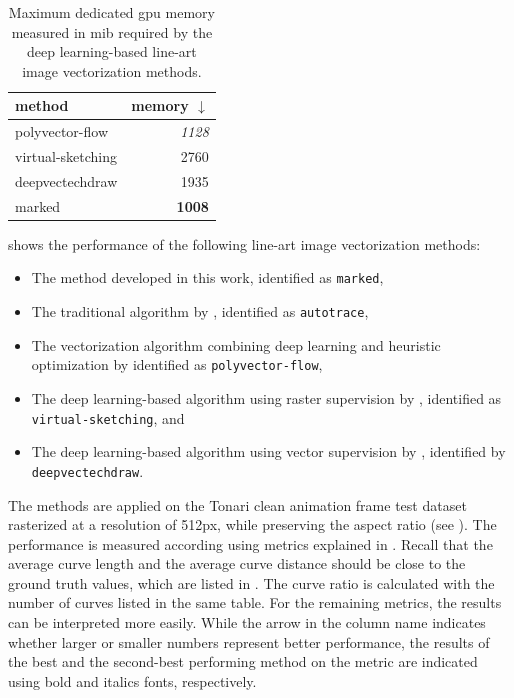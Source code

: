 \begin{table}[]
    \centering
    \begin{tabular}{l|r}
        method & memory $\downarrow$ \\
        \hline
        polyvector-flow & \textit{1128} \\
        virtual-sketching & 2760 \\
        deepvectechdraw & 1935 \\
        marked & \textbf{1008}
    \end{tabular}
    \caption{Maximum dedicated \gls{gpu} memory measured in \gls{mib} required by the deep learning-based line-art image vectorization methods.}
    \label{tab:max_memory}
\end{table}

 shows the performance of the following line-art image vectorization methods:

\begin{itemize}
    \item The method developed in this work, identified as \texttt{marked},
    \item The traditional algorithm by \citet{autotrace}, identified as \texttt{autotrace},
    \item The vectorization algorithm combining deep learning and heuristic optimization by \citet{Puhachov2021KeypointPolyvector} identified as \texttt{polyvector-flow},
    \item The deep learning-based algorithm using raster supervision by \citet{mo2021virtualsketching}, identified as \texttt{virtual-sketching}, and
    \item The deep learning-based algorithm using vector supervision by \citet{DBLP:conf/eccv/EgiazarianVAVST20}, identified by \texttt{deepvectechdraw}.
\end{itemize}

The methods are applied on the Tonari clean animation frame test dataset rasterized at a resolution of 512px, while preserving the aspect ratio (see ). The performance is measured according using metrics explained in . Recall that the average curve length and the average curve distance should be close to the ground truth values, which are listed in . The curve ratio is calculated with the number of curves listed in the same table. For the remaining metrics, the results can be interpreted more easily. While the arrow in the column name indicates whether larger or smaller numbers represent better performance, the results of the best and the second-best performing method on the metric are indicated using bold and italics fonts, respectively.


